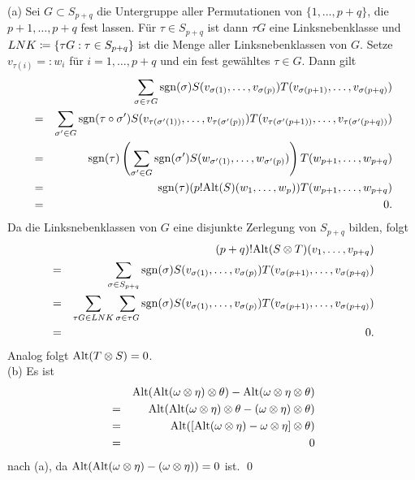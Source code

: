 \documentclass[a4paper,twoside,DIV15,BCOR12mm]{scrbook}
\DeclareMathOperator{\sgn}{sgn}
\begin{document}
\bigskip

 (a) Sei $G \subset S_{p+q}$ die Untergruppe 
aller Permutationen von $\{1,\dots,p+q\}$, die $p+1,\dots,p+q$ fest 
lassen. Für $\tau \in S_{p+q}$ ist dann $\tau G$ eine 
Linksnebenklasse und $LNK \da  \{\tau G: \tau \in S_{p+q}\}$ ist die 
Menge aller Linksnebenklassen von $G$. Setze $v_{\tau(i)} =: 
w_{i}$ für $i = 1,\dots,p+q$ und ein fest gewähltes $\tau \in 
G$. Dann gilt
\begin{eqnarray*}
&   & \sum_{\sigma \in \tau G} \sgn (\sigma) 
S(v_{\sigma(1)},\dots,v_{\sigma(p)}) 
T(v_{\sigma(p+1)},\dots,v_{\sigma(p+q)}) \\
& = & \sum_{\sigma' \in G} \sgn (\tau \circ \sigma') 
S(v_{\tau(\sigma'(1))},\dots,v_{\tau(\sigma'(p))}) 
T(v_{\tau(\sigma'(p+1))},\dots,v_{\tau(\sigma'(p+q))}) \\
& = & \sgn (\tau) \left(\sum_{\sigma' \in G} \sgn (\sigma') 
S(w_{\sigma'(1)},\dots,w_{\sigma'(p)})\right) 
T(w_{p+1},\dots,w_{p+q}) \\
& = & \sgn (\tau) (p! {\rm 
Alt}(S)(w_{1},\dots,w_{p}))T(w_{p+1},\dots,w_{p+q}) \\
& = & 0.
\end{eqnarray*}
Da die Linksnebenklassen von $G$ eine disjunkte Zerlegung von 
$S_{p+q}$ bilden, folgt
\begin{eqnarray*}
&   & (p+q)! {\rm Alt}(S \otimes T)(v_{1},\dots,v_{p+q}) \\
& = & \sum_{\sigma \in S_{p+q}} \sgn (\sigma) 
S(v_{\sigma(1)},\dots,v_{\sigma(p)}) 
T(v_{\sigma(p+1)},\dots,v_{\sigma(p+q)}) \\
& = & \sum_{\tau G \in LNK} \sum_{\sigma \in \tau G} {\rm 
sgn}(\sigma) S(v_{\sigma(1)},\dots,v_{\sigma(p)}) 
T(v_{\sigma(p+1)},\dots,v_{\sigma(p+q)}) \\
& = & 0.
\end{eqnarray*}
Analog folgt ${\rm Alt}(T \otimes S) = 0$.\\

\noindent
(b) Es ist
\begin{eqnarray*}
&   & {\rm Alt}({\rm Alt}(\omega \otimes \eta) \otimes \theta) - {\rm 
Alt}(\omega \otimes \eta \otimes \theta) \\
& = & {\rm Alt}({\rm Alt}(\omega \otimes \eta) \otimes \theta - 
(\omega \otimes \eta) \otimes \theta) \\
& = & {\rm Alt}([{\rm Alt}(\omega \otimes \eta) - \omega \otimes 
\eta] \otimes \theta) \\
& = & 0
\end{eqnarray*}
nach (a), da ${\rm Alt}({\rm Alt}(\omega \otimes \eta) - (\omega 
\otimes \eta)) = 0$ ist. \qed\\
\end{document}

